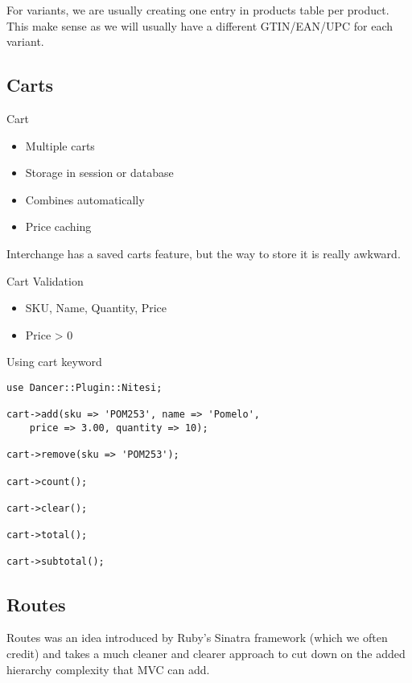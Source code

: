 For variants, we are usually creating one entry in products table per
product. This make sense as we will usually have a different GTIN/EAN/UPC
for each variant.

\subsection{Carts}
\begin{frame}{Cart}
\begin{itemize}
\item Multiple carts
\item Storage in session or database
\item Combines automatically
\item Price caching
\end{itemize}
\end{frame}

Interchange has a saved carts feature, but the way to store it is
really awkward.

\begin{frame}{Cart Validation}
\begin{itemize}
\item SKU, Name, Quantity, Price
\item Price > 0
\end{itemize}
\end{frame}

\begin{frame}[fragile]{Using cart keyword}
\begin{lstlisting}
use Dancer::Plugin::Nitesi;

cart->add(sku => 'POM253', name => 'Pomelo',
    price => 3.00, quantity => 10);

cart->remove(sku => 'POM253');

cart->count();

cart->clear();

cart->total();

cart->subtotal();
\end{lstlisting}
\end{frame}

\subsection{Routes}

Routes was an idea introduced by Ruby's Sinatra framework (which we often
credit) and takes a much cleaner and clearer approach to cut down on the
added hierarchy complexity that MVC can add.


